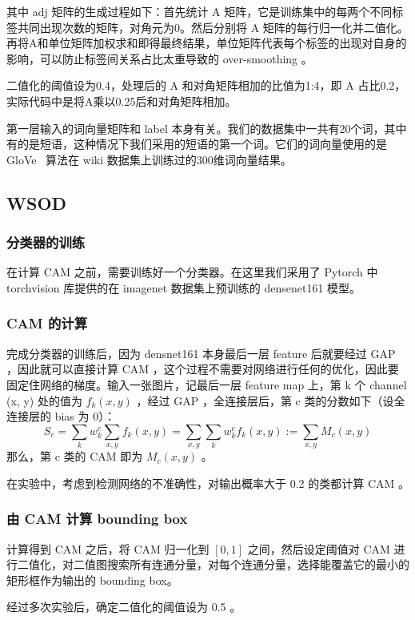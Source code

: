 \documentclass[a4paper]{ctexart}
\begin{document}
其中 adj 矩阵的生成过程如下：首先统计 A 矩阵，它是训练集中的每两个不同标签共同出现次数的矩阵，对角元为0。然后分别将 A 矩阵的每行归一化并二值化。再将A和单位矩阵加权求和即得最终结果，单位矩阵代表每个标签的出现对自身的影响，可以防止标签间关系占比太重导致的 over-smoothing 。

二值化的阈值设为0.4，处理后的 A 和对角矩阵相加的比值为1:4，即 A 占比0.2，实际代码中是将A乘以0.25后和对角矩阵相加。

第一层输入的词向量矩阵和 label 本身有关。我们的数据集中一共有20个词，其中有的是短语，这种情况下我们采用的短语的第一个词。它们的词向量使用的是 GloVe ~\cite{Pennington14glove:global}算法在 wiki 数据集上训练过的300维词向量结果。



\subsection{WSOD}
\subsubsection{分类器的训练}
在计算 CAM 之前，需要训练好一个分类器。在这里我们采用了 Pytorch 中 torchvision 库提供的在 imagenet 数据集上预训练的 densenet161 模型。

\subsubsection{CAM 的计算}
完成分类器的训练后，因为 densnet161 本身最后一层 feature 后就要经过 GAP ，因此就可以直接计算 CAM ，这个过程不需要对网络进行任何的优化，因此要固定住网络的梯度。输入一张图片，记最后一层 feature map 上，第 k 个 channel (x, y) 处的值为 $f_k(x, y)$ ，经过 GAP ，全连接层后，第 c 类的分数如下（设全连接层的 bias 为 0）：
$$S_c = \sum_k w_k^c \sum_{x, y}f_k(x, y) = \sum_{x, y}\sum_k w_k^c f_k(x, y):=\sum_{x, y} M_c(x, y)$$
那么，第 c 类的 CAM 即为 $M_c(x, y)$ 。

在实验中，考虑到检测网络的不准确性，对输出概率大于 0.2 的类都计算 CAM 。

\subsubsection{由 CAM 计算 bounding box}
计算得到 CAM 之后，将 CAM 归一化到 $[0, 1]$ 之间，然后设定阈值对 CAM 进行二值化，对二值图搜索所有连通分量，对每个连通分量，选择能覆盖它的最小的矩形框作为输出的 bounding box。

经过多次实验后，确定二值化的阈值设为 0.5 。
\end{document}
